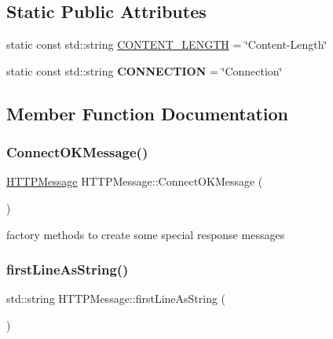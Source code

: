 \subsection*{Static Public Attributes}
\begin{DoxyCompactItemize}
\item 
static const std\+::string \hyperlink{class_h_t_t_p_message_a838b1a3df96db9e01deb4241de335777}{C\+O\+N\+T\+E\+N\+T\+\_\+\+L\+E\+N\+G\+TH} = \char`\"{}Content-\/Length\char`\"{}
\item 
\mbox{\label{class_h_t_t_p_message_ae2de06c4f65c963a1a0812aaafbe3a15}} 
static const std\+::string {\bfseries C\+O\+N\+N\+E\+C\+T\+I\+ON} = \char`\"{}Connection\char`\"{}
\end{DoxyCompactItemize}


\subsection{Member Function Documentation}
\mbox{\label{class_h_t_t_p_message_af0ceacfc73f35fe05767205dce0e2a83}} 
\subsubsection{\texorpdfstring{Connect\+O\+K\+Message()}{ConnectOKMessage()}}
{\footnotesize\ttfamily \hyperlink{class_h_t_t_p_message}{H\+T\+T\+P\+Message} H\+T\+T\+P\+Message\+::\+Connect\+O\+K\+Message (\begin{DoxyParamCaption}{ }\end{DoxyParamCaption})\hspace{0.3cm}{\ttfamily [static]}}

factory methods to create some special response messages \mbox{\label{class_h_t_t_p_message_a22626a364089ee0e10eaceaac9838d02}} 
\subsubsection{\texorpdfstring{first\+Line\+As\+String()}{firstLineAsString()}}
{\footnotesize\ttfamily std\+::string H\+T\+T\+P\+Message\+::first\+Line\+As\+String (\begin{DoxyParamCaption}{ }\end{DoxyParamCaption})}

